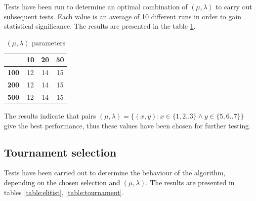 \documentclass[a4paper]{article}
\begin{document}
Tests have been run to determine an optimal combination of $(\mu, \lambda)$ to carry out subsequent tests. Each value is an average of 10 different runs in order to gain statistical significance. The results are presented in the table \ref{table:params}.

\begin{table}[h]
\centering
\caption{ $(\mu, \lambda)$ parameters}
\label{table:params}
\begin{tabular}{c|c|c|c}
& \textbf{10} & \textbf{20} & \textbf{50} \\
\hline
\textbf{100} & 12 & 14 & 15 \\
\hline
\textbf{200} & 12 & 14 & 15 \\
\hline
\textbf{500} & 12 & 14 & 15\\
\end{tabular}
\end{table}

The results indicate that pairs $(\mu, \lambda) = \{(x,y) : x \in \{1,2..3\} \wedge y \in \{5,6..7\}\}$ give the best performance, thus these values have been chosen for further testing.

\subsection{Tournament selection}

Tests have been carried out to determine the behaviour of the algorithm, depending on the chosen selection and $(\mu, \lambda)$. The results are presented in tables \ref{table:elitist}, \ref{table:tournament}.

\begin{table}[h]
\centering
\caption{Elitist selection}
\label{table:elitist}
\end{table}
\end{document}
